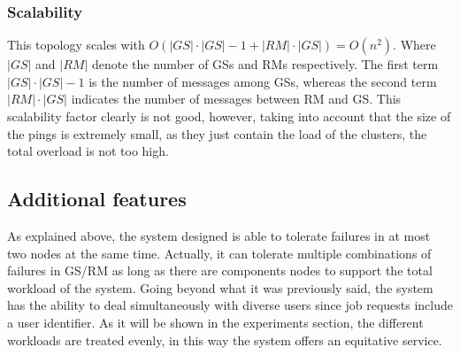 \subsubsection{Scalability}
This topology scales with $O(|GS|\cdot |GS|-1 + |RM|\cdot |GS|) = O(n^2)$. Where $|GS|$ and $|RM|$ denote the number of GSs and RMs respectively. The first term $|GS|\cdot |GS|-1$ is the number of messages among GSs, whereas the second term $|RM|\cdot |GS|$ indicates the number of messages between RM and GS. This scalability factor clearly is not good, however, taking into account that the size of the pings is extremely small, as they just contain the load of the clusters, the total overload is not too high.

\subsection{Additional features}
As explained above, the system designed is able to tolerate failures in at most two nodes at the same time. Actually, it can tolerate multiple combinations of failures in GS/RM as long as there are components nodes to support the total workload of the system. Going beyond what it was previously said, the system has the ability to deal simultaneously with diverse users since job requests include a user identifier. As it will be shown in the experiments section, the different workloads are treated evenly, in this way the system offers an equitative service.